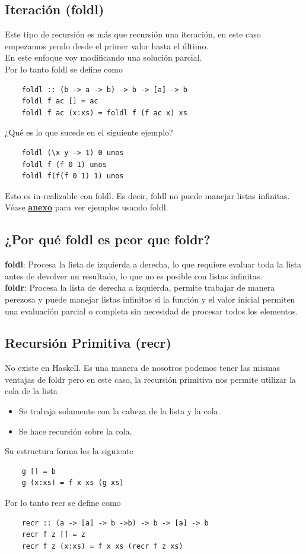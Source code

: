 \documentclass[10pt,a4paper]{article}
\begin{document}
\subsection*{Iteración (foldl)}
Este tipo de recursión es más que recursión una iteración, en este caso empezamos yendo desde el primer valor hasta el último. \\
En este enfoque voy modificando una solución parcial. \\
Por lo tanto foldl se define como
\begin{lstlisting}
    foldl :: (b -> a -> b) -> b -> [a] -> b 
    foldl f ac [] = ac
    foldl f ac (x:xs) = foldl f (f ac x) xs
\end{lstlisting}
¿Qué es lo que sucede en el siguiente ejemplo? \\
\begin{lstlisting}
    foldl (\x y -> 1) 0 unos
    foldl f (f 0 1) unos
    foldl f(f(f 0 1) 1) unos
\end{lstlisting}
Esto es in-realizable con foldl. Es decir, foldl no puede manejar listas infinitas. \\
Véase \hyperref[subsec:foldl_ejercicios]{\underline{\textbf{anexo}}} para ver ejemplos usando foldl.
\subsection*{¿Por qué foldl es peor que foldr?}
\textbf{foldl}: Procesa la lista de izquierda a derecha, lo que requiere evaluar toda la lista antes de devolver un resultado, lo que no es posible con listas infinitas. \\
\textbf{foldr}: Procesa la lista de derecha a izquierda, permite trabajar de manera perezosa y puede manejar listas infinitas si la función y el valor inicial permiten una evaluación parcial o completa sin necesidad de procesar todos los elementos.
\subsection*{Recursión Primitiva (recr)}
No existe en Haskell. Es una manera de nosotros podemos tener las mismas ventajas de foldr pero en este caso, la recursión primitiva nos permite utilizar la cola de la lista 
\begin{itemize}
    \item Se trabaja solamente con la cabeza de la lista y la cola.
    \item Se hace recursión sobre la cola.
\end{itemize}
Su estructura forma les la siguiente 
\begin{lstlisting}
    g [] = b
    g (x:xs) = f x xs (g xs)
\end{lstlisting}
Por lo tanto recr se define como 
\begin{lstlisting}
    recr :: (a -> [a] -> b ->b) -> b -> [a] -> b 
    recr f z [] = z
    recr f z (x:xs) = f x xs (recr f z xs)
\end{lstlisting}
\end{document}
